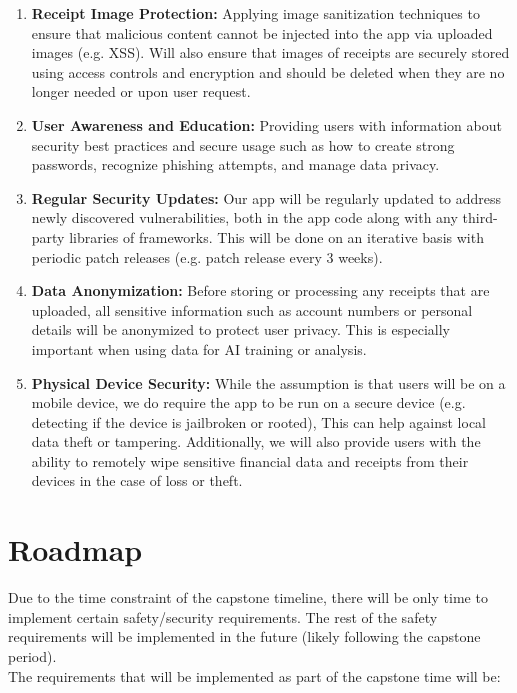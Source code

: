 \documentclass{article}
\begin{document}
\begin{enumerate}
	\item \textbf{Receipt Image Protection:} Applying image sanitization techniques to ensure that malicious content cannot be injected into the app via uploaded images (e.g. XSS). Will also ensure that images of receipts are securely stored using access controls and encryption and should be deleted when they are no longer needed or upon user request.
	\item \textbf{User Awareness and Education:} Providing users with information about security best practices and secure usage such as how to create strong passwords, recognize phishing attempts, and manage data privacy.
	\item \textbf{Regular Security Updates:} Our app will be regularly updated to address newly discovered vulnerabilities, both in the app code along with any third-party libraries of frameworks. This will be done on an iterative basis with periodic patch releases (e.g. patch release every 3 weeks).
	\item \textbf{Data Anonymization:} Before storing or processing any receipts that are uploaded, all sensitive information such as account numbers or personal details will be anonymized to protect user privacy. This is especially important when using data for AI training or analysis.
	\item \textbf{Physical Device Security:} While the assumption is that users will be on a mobile device, we do require the app to be run on a secure device (e.g. detecting if the device is jailbroken or rooted), This can help against local data theft or tampering. Additionally, we will also provide users with the ability to remotely wipe sensitive financial data and receipts from their devices in the case of loss or theft.
\end{enumerate}

\section{Roadmap}

Due to the time constraint of the capstone timeline, there will be only time to implement certain safety/security requirements. The rest of the safety requirements will be implemented in the future (likely following the capstone period). \\

\noindent The requirements that will be implemented as part of the capstone time will be:
\end{document}
